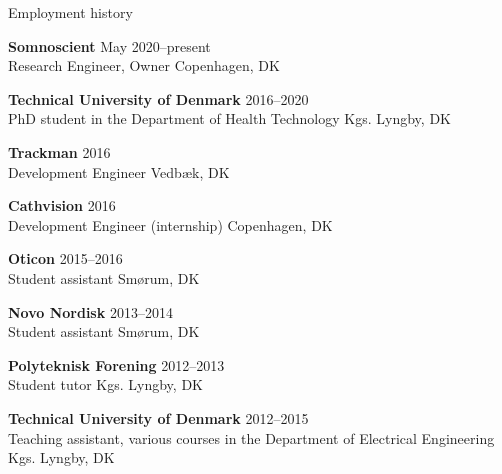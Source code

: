 \documentclass{resume} %
\begin{document}

\begin{rSection}{Employment history}

    {\bf Somnoscient} \hfill {May 2020--present} \\
    Research Engineer, Owner \hfill {Copenhagen, DK}
    
    {\bf Technical University of Denmark} \hfill {2016--2020} \\
    PhD student in the Department of Health Technology \hfill {Kgs. Lyngby, DK}
    
    {\bf Trackman} \hfill {2016} \\
    Development Engineer \hfill {Vedbæk, DK}
    
    {\bf Cathvision} \hfill {2016} \\
    Development Engineer (internship) \hfill {Copenhagen, DK}
    
    {\bf Oticon} \hfill {2015--2016} \\
    Student assistant \hfill {Smørum, DK}
    
    {\bf Novo Nordisk} \hfill {2013--2014} \\
    Student assistant \hfill {Smørum, DK}
    
    {\bf Polyteknisk Forening} \hfill {2012--2013} \\
    Student tutor \hfill {Kgs. Lyngby, DK}
    
    {\bf Technical University of Denmark} \hfill {2012--2015} \\
    Teaching assistant, various courses in the Department of Electrical Engineering \hfill {Kgs. Lyngby, DK}
    

	

\end{rSection}
\end{document}
